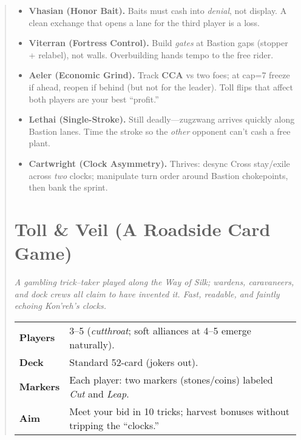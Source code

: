 \documentclass[11pt]{article}
\begin{document}
\begin{quote}
\begin{tcolorbox}[enhanced,breakable,title={Triad (3-Player, Bastion) — What Changes},
  colback=white,colframe=royal,boxrule=0.8pt]
\begin{itemize}[leftmargin=1.1em,itemsep=0.3em]
\item \textbf{Vhasian (Honor Bait).} Baits must cash into \emph{denial}, not display. A clean exchange that opens a lane for the third player is a loss.

\item \textbf{Viterran (Fortress Control).} Build \emph{gates} at Bastion gaps (stopper + relabel), not walls. Overbuilding hands tempo to the free rider.

\item \textbf{Aeler (Economic Grind).} Track \textbf{CCA} vs two foes; at cap=7 freeze if ahead, reopen if behind (but not for the leader). Toll flips that affect both players are your best “profit.”

\item \textbf{Lethai (Single-Stroke).} Still deadly—zugzwang arrives quickly along Bastion lanes. Time the stroke so the \emph{other} opponent can’t cash a free plant.

\item \textbf{Cartwright (Clock Asymmetry).} Thrives: desync Cross stay/exile across \emph{two} clocks; manipulate turn order around Bastion chokepoints, then bank the sprint.
\end{itemize}
\end{tcolorbox}

\clearpage


\section{Toll \& Veil (A Roadside Card Game)}
\emph{A gambling trick–taker played along the Way of Silk; wardens, caravaneers,
and dock crews all claim to have invented it. Fast, readable, and faintly
echoing Kon'reh's clocks.}

\vspace{0.25em}
\noindent\begin{tabularx}{\linewidth}{@{}>{\bfseries}l X@{}}
\toprule
Players & 3–5 (\emph{cutthroat}; soft alliances at 4–5 emerge naturally).\\
Deck & Standard 52-card (jokers out).\\
Markers & Each player: two markers (stones/coins) labeled \emph{Cut} and \emph{Leap}.\\
Aim & Meet your bid in 10 tricks; harvest bonuses without tripping the “clocks.”\\
\bottomrule
\end{tabularx}


\end{quote}
\end{document}
